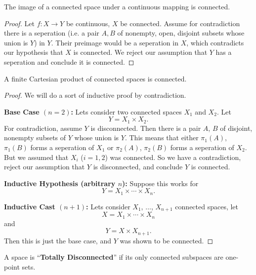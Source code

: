 \begin{thm}%
The image of a connected space under a continuous mapping is connected.
\end{thm}
\begin{proof}
Let $f:X\to Y$ be continuous, $X$ be connected. Assume for
contradiction there is a seperation (i.e. a pair $A,B$ of
nonempty, open, disjoint subsets whose union is $Y$) in
$Y$. Their preimage would be a seperation in $X$, which
contradicts our hypothesis that $X$ is connected. We reject our
assumption that $Y$ has a seperation and conclude it is connected.
\end{proof}
\begin{thm}%
A finite Cartesian product of connected spaces is connected.
\end{thm}
\begin{proof}
We will do a sort of inductive proof by contradiction.

\noindent\textbf{Base Case $(n=2)$:} Lets consider two connected
spaces $X_1$ and $X_2$. Let
\begin{equation}%
Y=X_1\times X_2.
\end{equation}
For contradiction, assume $Y$ is disconnected. Then there is a
pair $A$, $B$ of disjoint, nonempty subsets of $Y$ whose union is
$Y$. This means that either $\pi_{1}(A)$, $\pi_{1}(B)$ forms a
seperation of $X_1$ or $\pi_{2}(A)$, $\pi_{2}(B)$ forms a
seperation of $X_2$. But we assumed that $X_i$ ($i=1,2$) was
connected. So we have a contradiction, reject our assumption that
$Y$ is disconnected, and conclude $Y$ is connected.

\noindent\textbf{Inductive Hypothesis (arbitrary $n$):} Suppose
this works for
\begin{equation}%
Y = X_1\times\cdots\times X_n.
\end{equation}

\noindent\textbf{Inductive Cast $(n+1)$:} Lets consider $X_1$,
$\ldots$, $X_{n+1}$ connected spaces, let
\begin{equation}%
X = X_1\times\cdots\times X_n
\end{equation} 
and
\begin{equation}%
Y = X\times X_{n+1}.
\end{equation}
Then this is just the base case, and $Y$ was shown to be connected.
\end{proof}
\begin{defn}%
A space is ``\textbf{Totally Disconnected}'' if its only
connected subspaces are one-point sets.
\end{defn}
